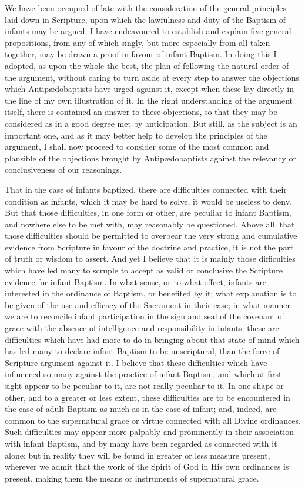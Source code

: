 \documentclass[]{book}
\begin{document}
We have been occupied of late with the consideration of the general principles laid down in Scripture, upon which the lawfulness and duty of the Baptism of infants may be argued. I have endeavoured to establish and explain five general propositions, from any of which singly, but more especially from all taken together, may be drawn a proof in favour of infant Baptism. In doing this I adopted, as upon the whole the best, the plan of following the natural order of the argument, without caring to turn aside at every step to answer the objections which Antipædobaptists have urged against it, except when these lay directly in the line of my own illustration of it. In the right understanding of the argument itself, there is contained an answer to these objections, so that they may be considered as in a good degree met by anticipation. But still, as the subject is an important one, and as it may better help to develop the principles of the argument, I shall now proceed to consider some of the most common and plausible of the objections brought by Antipædobaptists against the relevancy or conclusiveness of our reasonings.

That in the case of infants baptized, there are difficulties connected with their condition as infants, which it may be hard to solve, it would be useless to deny. But that those difficulties, in one form or other, are peculiar to infant Baptism, and nowhere else to be met with, may reasonably be questioned. Above all, that those difficulties should be permitted to overbear the very strong and cumulative evidence from Scripture in favour of the doctrine and practice, it is not the part of truth or wisdom to assert. And yet I believe that it is mainly those difficulties which have led many to scruple to accept as valid or conclusive the Scripture evidence for infant Baptism. In what sense, or to what effect, infants are interested in the ordinance of Baptism, or benefited by it; what explanation is to be given of the use and efficacy of the Sacrament in their case; in what manner we are to reconcile infant participation in the sign and seal of the covenant of grace with the absence of intelligence and responsibility in infants: these are difficulties which have had more to do in bringing about that state of mind which has led many to declare infant Baptism to be unscriptural, than the force of Scripture argument against it. I believe that these difficulties which have influenced so many against the practice of infant Baptism, and which at first sight appear to be peculiar to it, are not really peculiar to it. In one shape or other, and to a greater or less extent, these difficulties are to be encountered in the case of adult Baptism as much as in the case of infant; and, indeed, are common to the supernatural grace or virtue connected with all Divine ordinances. Such difficulties may appear more palpably and prominently in their association with infant Baptism, and by many have been regarded as connected with it alone; but in reality they will be found in greater or less measure present, wherever we admit that the work of the Spirit of God in His own ordinances is present, making them the means or instruments of supernatural grace.
\end{document}
